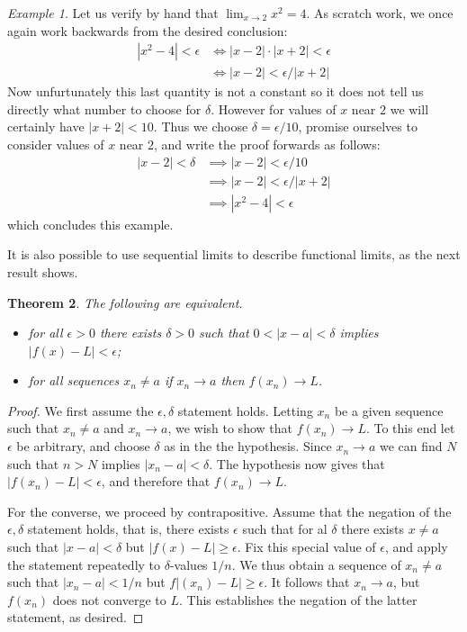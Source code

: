 \documentclass[11pt,oneside]{amsbook}
\theoremstyle{definition}
\theoremstyle{plain}
\newtheorem{theorem}{Theorem}[section]
\theoremstyle{definition}
\theoremstyle{remark}
\newtheorem{example}[theorem]{Example}
\numberwithin{equation}{section}
\numberwithin{figure}{section}
\begin{document}
\begin{example}
  Let us verify by hand that $\lim_{x\to2}x^2=4$. As scratch work, we once again work backwards from the desired conclusion:
  \begin{align*}
    |x^2-4|<\epsilon&\iff |x-2|\cdot|x+2|<\epsilon\\
                    &\iff |x-2|<\epsilon/|x+2|
  \end{align*}
  Now unfurtunately this last quantity is not a constant so it does not tell us directly what number to choose for $\delta$. However for values of $x$ near $2$ we will certainly have $|x+2|<10$. Thus we choose $\delta=\epsilon/10$, promise ourselves to consider values of $x$ near $2$, and write the proof forwards as follows:
  \begin{align*}
    |x-2|<\delta &\implies |x-2|<\epsilon/10\\
                 &\implies |x-2|<\epsilon/|x+2|\\
                 &\implies |x^2-4|<\epsilon
  \end{align*}
  which concludes this example.
\end{example}

It is also possible to use sequential limits to describe functional limits, as the next result shows.

\begin{theorem}
  The following are equivalent.
  \begin{itemize}
  \item for all $\epsilon>0$ there exists $\delta>0$ such that $0<|x-a|<\delta$ implies $|f(x)-L|<\epsilon$;
  \item for all sequences $x_n\neq a$ if $x_n\to a$ then $f(x_n)\to L$.
  \end{itemize}
\end{theorem}

\begin{proof}
  We first assume the $\epsilon,\delta$ statement holds. Letting $x_n$ be a given sequence such that $x_n\neq a$ and $x_n\to a$, we wish to show that $f(x_n)\to L$. To this end let $\epsilon$ be arbitrary, and choose $\delta$ as in the the hypothesis. Since $x_n\to a$ we can find $N$ such that $n>N$ implies $|x_n-a|<\delta$. The hypothesis now gives that $|f(x_n)-L|<\epsilon$, and therefore that $f(x_n)\to L$.

  For the converse, we proceed by contrapositive. Assume that the negation of the $\epsilon,\delta$ statement holds, that is, there exists $\epsilon$ such that for al $\delta$ there exists $x\neq a$ such that $|x-a|<\delta$ but $|f(x)-L|\geq\epsilon$. Fix this special value of $\epsilon$, and apply the statement repeatedly to $\delta$-values $1/n$. We thus obtain a sequence of $x_n\neq a$ such that $|x_n-a|<1/n$ but $f|(x_n)-L|\geq\epsilon$. It follows that $x_n\to a$, but $f(x_n)$ does not converge to $L$. This establishes the negation of the latter statement, as desired.
\end{proof}  
\end{document}
